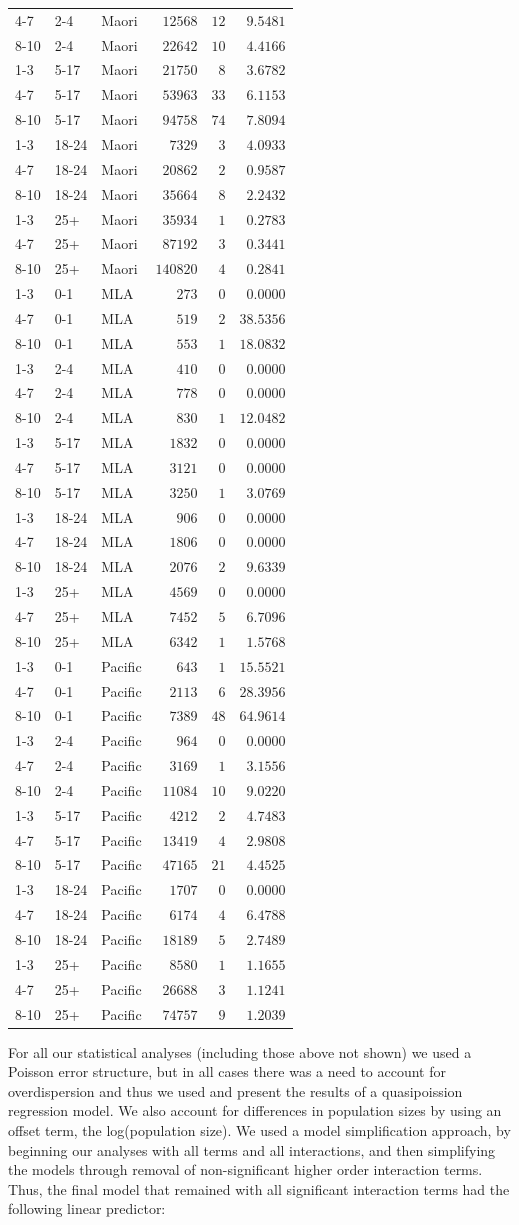 \documentclass{article}
\begin{document}
\begin{table}[hbtp]
\begin{center}
\begin{tabular}{lllrrr}
4-7&2-4&Maori&$ 12568$&$ 12$&$ 9.5481$\tabularnewline
8-10&2-4&Maori&$ 22642$&$ 10$&$ 4.4166$\tabularnewline
1-3&5-17&Maori&$ 21750$&$  8$&$ 3.6782$\tabularnewline
4-7&5-17&Maori&$ 53963$&$ 33$&$ 6.1153$\tabularnewline
8-10&5-17&Maori&$ 94758$&$ 74$&$ 7.8094$\tabularnewline
1-3&18-24&Maori&$  7329$&$  3$&$ 4.0933$\tabularnewline
4-7&18-24&Maori&$ 20862$&$  2$&$ 0.9587$\tabularnewline
8-10&18-24&Maori&$ 35664$&$  8$&$ 2.2432$\tabularnewline
1-3&25+&Maori&$ 35934$&$  1$&$ 0.2783$\tabularnewline
4-7&25+&Maori&$ 87192$&$  3$&$ 0.3441$\tabularnewline
8-10&25+&Maori&$140820$&$  4$&$ 0.2841$\tabularnewline
1-3&0-1&MLA&$   273$&$  0$&$ 0.0000$\tabularnewline
4-7&0-1&MLA&$   519$&$  2$&$38.5356$\tabularnewline
8-10&0-1&MLA&$   553$&$  1$&$18.0832$\tabularnewline
1-3&2-4&MLA&$   410$&$  0$&$ 0.0000$\tabularnewline
4-7&2-4&MLA&$   778$&$  0$&$ 0.0000$\tabularnewline
8-10&2-4&MLA&$   830$&$  1$&$12.0482$\tabularnewline
1-3&5-17&MLA&$  1832$&$  0$&$ 0.0000$\tabularnewline
4-7&5-17&MLA&$  3121$&$  0$&$ 0.0000$\tabularnewline
8-10&5-17&MLA&$  3250$&$  1$&$ 3.0769$\tabularnewline
1-3&18-24&MLA&$   906$&$  0$&$ 0.0000$\tabularnewline
4-7&18-24&MLA&$  1806$&$  0$&$ 0.0000$\tabularnewline
8-10&18-24&MLA&$  2076$&$  2$&$ 9.6339$\tabularnewline
1-3&25+&MLA&$  4569$&$  0$&$ 0.0000$\tabularnewline
4-7&25+&MLA&$  7452$&$  5$&$ 6.7096$\tabularnewline
8-10&25+&MLA&$  6342$&$  1$&$ 1.5768$\tabularnewline
1-3&0-1&Pacific&$   643$&$  1$&$15.5521$\tabularnewline
4-7&0-1&Pacific&$  2113$&$  6$&$28.3956$\tabularnewline
8-10&0-1&Pacific&$  7389$&$ 48$&$64.9614$\tabularnewline
1-3&2-4&Pacific&$   964$&$  0$&$ 0.0000$\tabularnewline
4-7&2-4&Pacific&$  3169$&$  1$&$ 3.1556$\tabularnewline
8-10&2-4&Pacific&$ 11084$&$ 10$&$ 9.0220$\tabularnewline
1-3&5-17&Pacific&$  4212$&$  2$&$ 4.7483$\tabularnewline
4-7&5-17&Pacific&$ 13419$&$  4$&$ 2.9808$\tabularnewline
8-10&5-17&Pacific&$ 47165$&$ 21$&$ 4.4525$\tabularnewline
1-3&18-24&Pacific&$  1707$&$  0$&$ 0.0000$\tabularnewline
4-7&18-24&Pacific&$  6174$&$  4$&$ 6.4788$\tabularnewline
8-10&18-24&Pacific&$ 18189$&$  5$&$ 2.7489$\tabularnewline
1-3&25+&Pacific&$  8580$&$  1$&$ 1.1655$\tabularnewline
4-7&25+&Pacific&$ 26688$&$  3$&$ 1.1241$\tabularnewline
8-10&25+&Pacific&$ 74757$&$  9$&$ 1.2039$\tabularnewline
\hline
\end{tabular}\end{center}\label{table:percap}
\end{table}

For all our statistical analyses (including those above not shown) we used a Poisson error structure, but in all cases there was a need to account for overdispersion and thus we used and present the results of a quasipoission regression model. We also account for differences in population sizes by using an offset term, the log(population size). We used a model simplification approach, by beginning our analyses with all terms and all interactions, and then simplifying the models through removal of non-significant higher order interaction terms. Thus, the final model that remained with all significant interaction terms had the following linear predictor:
\end{document}
